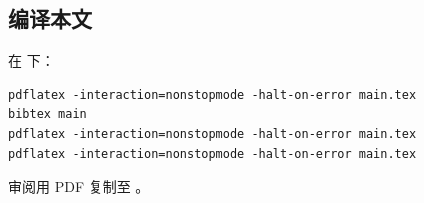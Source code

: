 \subsection{编译本文}

在  下：
\begin{verbatim}
pdflatex -interaction=nonstopmode -halt-on-error main.tex
bibtex main
pdflatex -interaction=nonstopmode -halt-on-error main.tex
pdflatex -interaction=nonstopmode -halt-on-error main.tex
\end{verbatim}
审阅用 PDF 复制至
。
